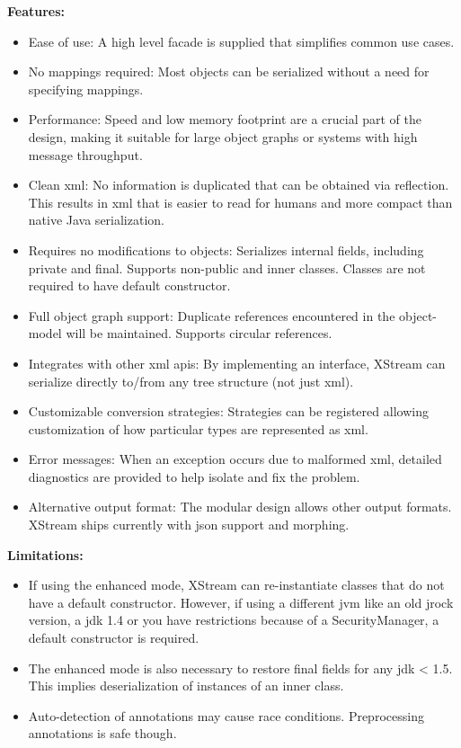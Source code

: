 \textbf{Features:}
\begin{itemize}
\item{}Ease of use: A high level facade is supplied that simplifies common use cases.
\item{}No mappings required: Most objects can be serialized without a need for specifying mappings.
\item{}Performance: Speed and low memory footprint are a crucial part of the design, making it suitable for large object graphs or systems with high message throughput.
\item{}Clean \gls{xml}: No information is duplicated that can be obtained via reflection. This results in \gls{xml} that is easier to read for humans and more compact than native Java serialization.
\item{}Requires no modifications to objects: Serializes internal fields, including private and final. Supports non-public and inner classes. Classes are not required to have default constructor.
\item{}Full object graph support: Duplicate references encountered in the object-model will be maintained. Supports circular references.
\item{}Integrates with other \gls{xml} \gls{api}s: By implementing an interface, XStream can serialize directly to/from any tree structure (not just \gls{xml}).
\item{}Customizable conversion strategies: Strategies can be registered allowing customization of how particular types are represented as \gls{xml}.
\item{}Error messages: When an exception occurs due to malformed \gls{xml}, detailed diagnostics are provided to help isolate and fix the problem.
\item{}Alternative output format: The modular design allows other output formats. XStream ships currently with \gls{json} support and morphing.
\end{itemize}

\textbf{Limitations:}
\begin{itemize}
\item{}If using the enhanced mode, XStream can re-instantiate classes that do not have a default constructor. However, if using a different \gls{jvm} like an old \gls{jrock} version, a \gls{jdk} 1.4 or you have restrictions because of a SecurityManager, a default constructor is required.
\item{}The enhanced mode is also necessary to restore final fields for any \gls{jdk} < 1.5. This implies deserialization of instances of an inner class.
\item{}Auto-detection of annotations may cause race conditions. Preprocessing annotations is safe though.
\end{itemize}